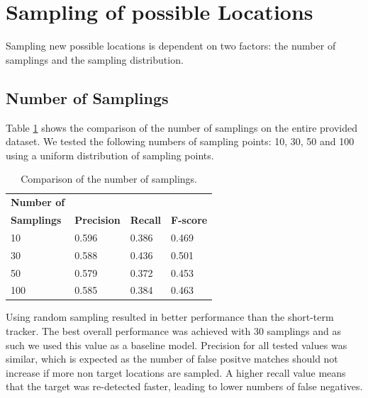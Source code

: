 \documentclass[9pt]{IEEEtran}
\begin{document}
\section{Sampling of possible Locations}
Sampling new possible locations is dependent on two factors: the number of samplings and the sampling distribution.


\subsection*{Number of Samplings}
Table \ref{tab:num_samplings} shows the comparison of the number of samplings on the entire provided dataset.
We tested the following numbers of sampling points: 10, 30, 50 and 100 using a uniform distribution of sampling points.
\begin{table}[!ht]
    \centering
    \begin{tabular}{llll}
        \textbf{Number of} \\ \textbf{Samplings} & \textbf{Precision} & \textbf{Recall} & \textbf{F-score} \\ \hline
        10 & 0.596 & 0.386 & 0.469 \\ 
        30 & 0.588 & 0.436 & 0.501 \\ 
        50 & 0.579 & 0.372 & 0.453 \\ 
        100 & 0.585 & 0.384 & 0.463 \\ 
    \end{tabular}
    \caption{Comparison of the number of samplings.}
    \label{tab:num_samplings}
\end{table}
Using random sampling resulted in better performance than the short-term tracker.
The best overall performance was achieved with 30 samplings and as such we used this value as a baseline model.
Precision for all tested values was similar, which is expected as the number of false positve matches should not increase if more non target locations are sampled.
A higher recall value means that the target was re-detected faster, leading to lower numbers of false negatives. 
\end{document}

